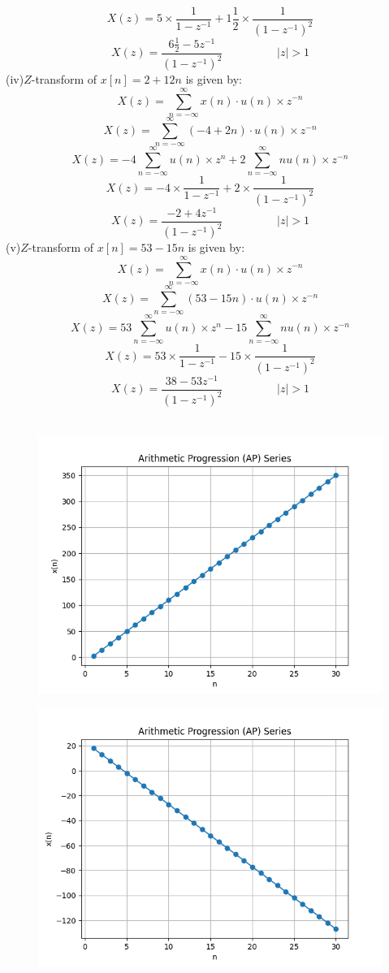 \documentclass[journal,12pt,twocolumn]{IEEEtran}
\theoremstyle{remark}
\begin{document}
\[X(z)=5 \times \frac{1}{1-{z^{-1}}}+ 1\frac{1}{2}\times \frac{1}{(1-{z^{-1}})^2}\]
\[X(z)=\frac{6\frac{1}{2}-5{z^{-1}}}{(1-{z^{-1}})^2} \hspace{2cm}  |z|>1\]
(iv)$Z$-transform of $x[n] = 2 + 12n$ is given by:
\[ X(z) = \sum_{n=-\infty}^{\infty} x(n)\cdot u(n)\times z^{-n} \]
\[ X(z) = \sum_{n=-\infty}^{\infty} (-4 + 2n)\cdot u(n) \times z^{-n} \]
\[X(z)=-4 \sum_{n=-\infty}^{\infty}u(n) \times z^{n}+2 \sum_{n=-\infty}^{\infty} nu(n) \times z^{-n}\]
\[X(z)=-4 \times \frac{1}{1-{z^{-1}}}+ 2 \times \frac{1}{(1-{z^{-1}})^2}\]
\[X(z)=\frac{-2+4{z^{-1}}}{(1-{z^{-1}})^2} \hspace{2cm}  |z|>1\]
(v)$Z$-transform of $x[n] = 53 - 15n$ is given by:
\[ X(z) = \sum_{n=-\infty}^{\infty} x(n)\cdot u(n)\times z^{-n} \]
\[ X(z) = \sum_{n=-\infty}^{\infty} (53 - 15n)\cdot u(n) \times z^{-n} \]
\[X(z)=53 \sum_{n=-\infty}^{\infty}u(n)\times z^{n}-15 \sum_{n=-\infty}^{\infty} nu(n)\times z^{-n}\]
\[X(z)=53 \times \frac{1}{1-{z^{-1}}}- 15 \times \frac{1}{(1-{z^{-1}})^2}\]
\[X(z)=\frac{38-53{z^{-1}}}{(1-{z^{-1}})^2} \hspace{2cm}  |z|>1\]\\
\begin{figure}[h]
       \vspace*{-1cm}
       \centering
        \includegraphics[width=0.8\linewidth]{figures/download.png} %
        \caption{}
   \label{fig:your_label}
\end{figure}
\begin{figure}[h]
      \vspace*{-1cm}
      \centering
       \includegraphics[width=0.8\linewidth]{figures/download2.png} %
        \caption{}
    \end{figure}
\end{document}
